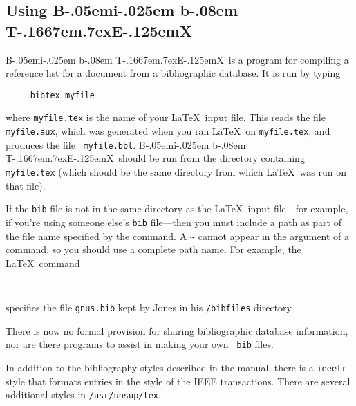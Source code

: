 \documentclass{article}
\newcommand{\BibTeX}{{\rm B\kern-.05em{\sc i\kern-.025em b}\kern-.08em
    T\kern-.1667em\lower.7ex\hbox{E}\kern-.125emX}}
\newcommand{\SLiTeX}{{\rm S\kern-.06em{\sc l\kern-.035emi}\kern-.06em T\kern
   -.1667em\lower.7ex\hbox{E}\kern-.125emX}}
\begin{document}


\subsection{Using \BibTeX}

\BibTeX\ is a program for compiling a reference list for a document
from a bibliographic database.  It is run by typing
\begin{verbatim}
     bibtex myfile
\end{verbatim}
where \mbox{\tt myfile.tex} is the name of your \LaTeX\ input file.
This reads the file \mbox{\tt myfile.aux}, which was generated when you
ran \LaTeX\ on \mbox{\tt myfile.tex}, and produces the file \mbox{\tt
myfile.bbl}.  \BibTeX\ should be run from the directory containing
\mbox{\tt myfile.tex} (which should be the same directory from which
\LaTeX\ was run on that file).

If the {\tt bib} file is not in the same directory as the \LaTeX\ input
file---for example, if you're using someone else's {\tt bib}
file---then you must include a path as part of the file name specified
by the \hbox{\verb||} command.  A \verb|~| cannot appear
in the argument of a \hbox{\verb||} command, so you should
use a complete path name.  For example, the \LaTeX\ command
\begin{verbatim}
     
\end{verbatim}
specifies the file \mbox{\tt gnus.bib} kept by Jones in his 
\mbox{\tt /bibfiles} directory.


There is now no formal provision for sharing bibliographic database
information, nor are there programs to assist in making your own {\tt
bib} files.

In addition to the bibliography styles described in the manual, there
is a {\tt ieeetr} style that formats entries in the style of the IEEE
transactions.
There are several additional styles in {\tt /usr/unsup/tex}.
\end{document}
